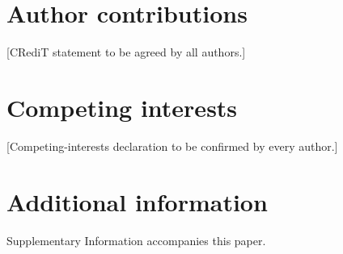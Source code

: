 \documentclass[11pt]{article}
\newcommand{\authorinput}[1]{\textcolor{red!70!black}{[#1]}}
\begin{document}
\section*{Author contributions}
\authorinput{CRediT statement to be agreed by all authors.}

\section*{Competing interests}
\authorinput{Competing-interests declaration to be confirmed by every author.}

\section*{Additional information}
Supplementary Information accompanies this paper.
\end{document}
